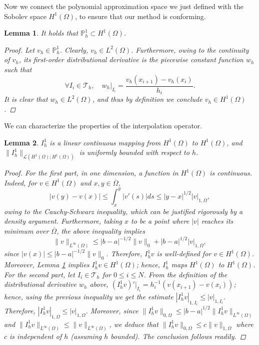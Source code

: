 \documentclass{article}
\newtheorem{lemma}{Lemma}
\begin{document}
Now we connect the polynomial approximation space we just defined with the Sobolev space $H^1(\Omega)$, to ensure that our method is conforming. 
\begin{lemma}\label{approxP1}
    It holds that $\mathbb{P}_h^1 \subset H^1(\Omega)$.
    \begin{proof}
    Let $v_h \in \mathbb{P}_h^1$. Clearly, $v_h \in L^2(\Omega)$. Furthermore, owing to the continuity of $v_h$, its first-order distributional derivative is the piecewise constant function $w_h$ such that
    $$\forall I_i \in \mathcal{T}_h,\quad  w_h|_{I_i} = \frac{v_h(x_{i+1}) - v_h(x_i)}{h_i}.$$
    It is clear that $w_h\in L^2(\Omega)$, and thus by definition we conclude $v_h\in H^1(\Omega)$.
    \end{proof}
\end{lemma}
We can characterize the properties of the interpolation operator. 
\begin{lemma}\label{cont1D}
    $I_h^1$ is a linear continuous mapping from $H^1(\Omega)$ to $H^1(\Omega)$, and $\|I_h^1\|_{\mathcal{L}(H^1(\Omega);H^1(\Omega))}$ is uniformly bounded with respect to $h$.
    \begin{proof}
    For the first part, in one dimension, a function in $H^1(\Omega)$ is continuous. Indeed, for $v \in H^1(\Omega)$ and $x,y \in \overline{\Omega}$,
    \begin{equation}\label{eq:interpolator_continuity_1d}
        |v(y) - v(x)| \le \int_x^y |v'(s)| ds  \le |y-x|^{1/2} |v|_{1,\Omega},
    \end{equation}
    owing to the Cauchy-Schwarz inequality, which can be justified rigorously by a density argument. Furthermore, taking $x$ to be a point where $|v|$ reaches its minimum over $\overline{\Omega}$, the above inequality implies
    \begin{equation}\label{interpolator_continuity_1d}
        \|v\|_{L^\infty(\Omega)} \le |b-a|^{-1/2} \|v\|_0 + |b-a|^{1/2}|v|_{1,\Omega},
    \end{equation}
    since $|v(x)| \le |b-a|^{-1/2} \|v\|_{0}$. Therefore, $I_h^1 v$ is well-defined for $v \in H^1(\Omega)$. Moreover, Lemma \ref{approxP1} implies $I_h^1 v \in H^1(\Omega)$; hence, $I_h^1$ maps $H^1(\Omega)$ to $H^1(\Omega)$.
    For the second part, let $I_i \in \mathcal{T}_h$ for $0 \le i \le N$. From the definition of the distributional derivative $w_h$ above, $(I_h^1 v)'|_{I_i} = h_i^{-1}(v(x_{i+1}) - v(x_i))$; hence, using the previous inequality we get the estimate $|I_h^1 v|_{1,I_i} \le |v|_{1,I_i}$. Therefore, $|I_h^1 v|_{1,\Omega} \le |v|_{1,\Omega}$. Moreover, since $\|I_h^1 v\|_{0,\Omega} \le |b-a|^{1/2} \|I_h^1 v\|_{L^\infty(\Omega)}$ and $\|I_h^1 v\|_{L^\infty(\Omega)} \le \|v\|_{L^\infty(\Omega)}$, we deduce that $\|I_h^1 v\|_{0,\Omega} \le c \|v\|_{1,\Omega}$ where $c$ is independent of $h$ (assuming $h$ bounded). The conclusion follows readily.
    \end{proof}
\end{lemma}
\end{document}
